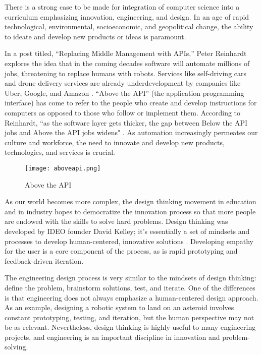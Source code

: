 \label{innovate}
There is a strong case to be made for integration of computer science into a curriculum emphasizing innovation, engineering, and design. In an age of rapid technological, environmental, socioeconomic, and geopolitical change, the ability to ideate and develop new products or ideas is paramount.\par
In a post titled, ``Replacing Middle Management with APIs,'' Peter Reinhardt explores the idea that in the coming decades software will automate millions of jobs, threatening to replace humans with robots. Services like self-driving cars and drone delivery services are already underdevelopment by companies like Uber, Google, and Amazon \cite{aboveap}. ``Above the API'' (the application programming interface) has come to refer to the people who create and develop instructions for computers as opposed to those who follow or implement them. According to Reinhardt, ``as the software layer gets thicker, the gap between Below the API jobs and Above the API jobs widens" \cite{aboveap}. As automation increasingly permeates our culture and workforce, the need to innovate and develop new products, technologies, and services is crucial.\par
\begin{figure}[!ht]
  \caption{Above the API \cite{aboveap}}
  \centering
    \texttt{[image: aboveapi.png]}
\end{figure}
As our world becomes more complex, the design thinking movement in education and in industry hopes to democratize the innovation process so that more people are endowed with the skills to solve hard problems. Design thinking was developed by IDEO founder David Kelley; it's essentially a set of mindsets and processes to develop human-centered, innovative solutions \cite{forbesdt}. Developing empathy for the user is a core component of the process, as is rapid prototyping and feedback-driven iteration.\par
The engineering design process is very similar to the mindsets of design thinking: define the problem, brainstorm solutions, test, and iterate. One of the differences is that engineering does not always emphasize a human-centered design approach. As an example, designing a robotic system to land on an asteroid involves constant prototyping, testing, and iteration, but the human perspective may not be as relevant. Nevertheless, design thinking is highly useful to many engineering projects, and engineering is an important discipline in innovation and problem-solving. \par
